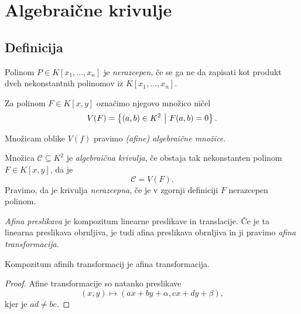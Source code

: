 \section{Algebraične krivulje}

\subsection{Definicija}


\begin{definicija}
Polinom $P \in K[x_1, \dots, x_n]$ je
\emph{nerazcepen}, če se ga ne da zapisati
kot produkt dveh nekonstantnih polinomov iz $K[x_1, \dots, x_n]$.
\end{definicija}

\begin{definicija}
Za polinom $F \in K[x,y]$ označimo njegovo množico ničel
\[
V(F) = \left\{(a,b) \in K^2~\middle\vert~F(a,b) = 0\right\}.
\]
\end{definicija}

\begin{opomba}
Množicam oblike $V(f)$ pravimo
\emph{(afine) algebraične množice}.
\end{opomba}

\begin{okvir}
\begin{definicija}
Množica $\mathcal{C} \subseteq K^2$ je
\emph{algebraična krivulja}, če obstaja
tak nekonstanten polinom $F \in K[x,y]$, da je
\[
\mathcal{C} = V(F).
\]
Pravimo, da je krivulja
\emph{nerazcepna}, če je v
zgornji definiciji $F$ nerazcepen polinom.
\end{definicija}
\end{okvir}

\begin{definicija}
\emph{Afina preslikava} je kompozitum
linearne preslikave in translacije. Če je ta linearna preslikava
obrnljiva, je tudi afina preslikava obrnljiva in ji pravimo
\emph{afina transformacija}.
\end{definicija}

\begin{trditev}
Kompozitum afinih transformacij je afina transformacija.
\end{trditev}

\begin{proof}
Afine transformacije so natanko preslikave
\[
(x,y) \mapsto (ax + by + \alpha, cx + dy + \beta),
\]
kjer je $ad \ne bc$.
\end{proof}

